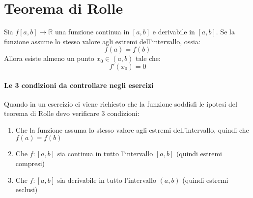 \section{Teorema di Rolle}
Sia $f[a,b]\rightarrow \mathbb{R}$ una funzione continua in $[a,b]$ e
derivabile in $[a,b]$. Se la funzione assume lo stesso valore agli estremi
dell'intervallo, ossia:
\[
	f(a)=f(b)
\]
Allora esiste almeno un punto $x_0 \in (a, b)$ tale che:
\[
	f'(x_0) = 0
\]
\paragraph*{Le 3 condizioni da controllare negli esercizi}
Quando in un esercizio ci viene richiesto che la funzione soddisfi le ipotesi del
teorema di Rolle devo verificare 3 condizioni:
\begin{enumerate}
	\item Che la funzione assuma lo stesso valore agli estremi dell'intervallo, quindi che $f(a) = f(b)$
	\item Che $f:[a,b]$ sia continua in tutto l'intervallo $[a,b]$ (quindi estremi compresi)
	\item Che $f:[a,b]$ sia derivabile in tutto l'intervallo $(a,b)$ (quindi estremi esclusi)
\end{enumerate}

